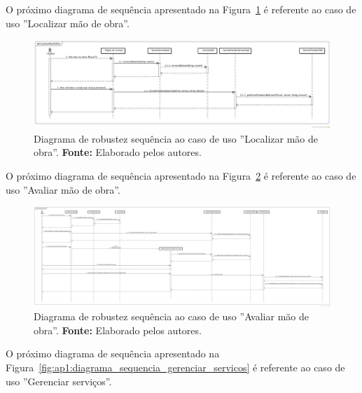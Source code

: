 \begin{landscape}
O próximo diagrama de sequência apresentado na Figura~\ref{fig:ap1:diagrama_sequencia_localizar_mao_de_obra} é referente ao caso de uso ''Localizar mão de obra''.

\newpage
\captionsetup[figure]{list=no}
\begin{figure}[h!]
	\centerline{\includegraphics[scale=0.35]{./imagens/apendices/diagrama-sequencia-localizar-mao-de-obra.png}}
	\caption[Diagrama de sequência referente ao caso de uso ''Localizar mão de obra''.]
	{Diagrama de robustez sequência ao caso de uso ''Localizar mão de obra''. \textbf{Fonte:} Elaborado pelos autores.}
	\label{fig:ap1:diagrama_sequencia_localizar_mao_de_obra}
\end{figure}

O próximo diagrama de sequência apresentado na Figura~\ref{fig:ap1:diagrama_sequencia_avaliar_mao_de_obra} é referente ao caso de uso ''Avaliar mão de obra''.

\newpage
\captionsetup[figure]{list=no}
\begin{figure}[h!]
	\centerline{\includegraphics[scale=0.17]{./imagens/apendices/diagrama-sequencia-avaliar-mao-de-obra.png}}
	\caption[Diagrama de sequência referente ao caso de uso ''Avaliar mão de obra''.]
	{Diagrama de robustez sequência ao caso de uso ''Avaliar mão de obra''. \textbf{Fonte:} Elaborado pelos autores.}
	\label{fig:ap1:diagrama_sequencia_avaliar_mao_de_obra}
\end{figure}

O próximo diagrama de sequência apresentado na Figura~\ref{fig:ap1:diagrama_sequencia_gerenciar_servicos} é referente ao caso de uso ''Gerenciar serviços''.


\end{landscape}
